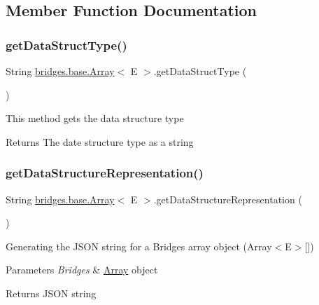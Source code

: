 \subsection{Member Function Documentation}
\mbox{\label{classbridges_1_1base_1_1_array_ad138b9787d46d053d6bd324b344be9a6}} 
\subsubsection{\texorpdfstring{get\+Data\+Struct\+Type()}{getDataStructType()}}
{\footnotesize\ttfamily String \mbox{\hyperlink{classbridges_1_1base_1_1_array}{bridges.\+base.\+Array}}$<$ E $>$.get\+Data\+Struct\+Type (\begin{DoxyParamCaption}{ }\end{DoxyParamCaption})}

This method gets the data structure type

\begin{DoxyReturn}{Returns}
The date structure type as a string 
\end{DoxyReturn}
\mbox{\label{classbridges_1_1base_1_1_array_a111592e8b75202064bdf06d9c2234d74}} 
\subsubsection{\texorpdfstring{get\+Data\+Structure\+Representation()}{getDataStructureRepresentation()}}
{\footnotesize\ttfamily String \mbox{\hyperlink{classbridges_1_1base_1_1_array}{bridges.\+base.\+Array}}$<$ E $>$.get\+Data\+Structure\+Representation (\begin{DoxyParamCaption}{ }\end{DoxyParamCaption})}

Generating the J\+S\+ON string for a Bridges array object (Array$<$\+E$>$\mbox{[}\mbox{]})


\begin{DoxyParams}{Parameters}
{\em Bridges} & \mbox{\hyperlink{classbridges_1_1base_1_1_array}{Array}} object\\
\hline
\end{DoxyParams}
\begin{DoxyReturn}{Returns}
J\+S\+ON string 
\end{DoxyReturn}
\mbox{\label{classbridges_1_1base_1_1_array_af7aa7f3f18989af5f48a2b69cb7fb07d}} 

